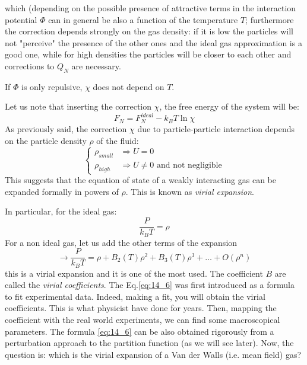 \documentclass[../main/main.tex]{subfiles}
\begin{document}
which (depending on the possible presence of attractive terms in the interaction potential \( \Phi  \) can in general be also a function of the temperature \( T \);
furthermore the correction depends strongly on the gas density: if it is low the particles will not "perceive" the presence of the other ones and the ideal gas approximation is a good one, while for high densities the particles will be closer to each other and corrections to \( Q_N \) are necessary.
\begin{remark}
If \( \Phi  \) is only repulsive, \( \chi  \) does not depend on \( T \).
\end{remark}
Let us note that inserting the correction \( \chi  \), the free energy of the system will be:
\begin{equation}
  F_N = F_N^{ideal} - k_B T \ln{\chi }
\end{equation}
As previously said, the correction \( \chi  \) due to particle-particle interaction depends on the particle density \( \rho  \) of the fluid:
\begin{equation}
  \begin{cases}
   \rho _{small} &\Rightarrow  U = 0 \\
   \rho _{high} &\Rightarrow  U \neq 0 \text{ and not negligible}
  \end{cases}
\end{equation}
This suggests that the equation of state of a weakly interacting gas can be expanded formally in powers of \( \rho  \). This is known as \emph{virial expansion}.

In particular, for the ideal gas:
\begin{equation*}
  \frac{P}{k_B T} = \rho
\end{equation*}
For a non ideal gas, let us add the other terms of the expansion
\begin{equation}
  \rightarrow \frac{P}{k_B T} = \rho + B_2 (T) \rho ^2 + B_3 (T)\rho ^3+ \dots + O(\rho ^n)
  \label{eq:14_6}
\end{equation}
this is a virial expansion and it is one of the most used. The coefficient \( B \) are called the \emph{virial coefficients}.
The Eq.\eqref{eq:14_6} was first introduced as a formula to fit experimental data. Indeed, making a fit, you will obtain the virial coefficients. This is what physicist have done for years.  Then, mapping the coefficient with the real world experiments, we can find some macroscopical parameters.
The formula \eqref{eq:14_6} can be also obtained rigorously from a perturbation approach to the partition function (as we will see later). Now, the question is: which is the virial expansion of a Van der Walls (i.e. mean field) gas?
\end{document}

